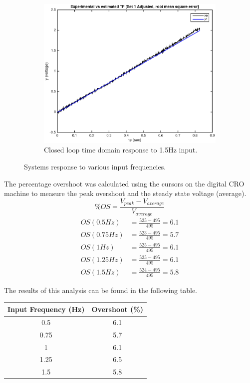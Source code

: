 \documentclass[11pt,a4paper]{article}
\begin{document}
\begin{enumerate}
\begin{figure}[H]
	  \begin{subfigure}{0.5\textwidth}
	  \includegraphics[width=0.9\linewidth]{Matlab_Figures/y2_dataset1_rms.eps}
	  \caption{Closed loop time domain response to 1.5Hz input.}
	  \label{fig:subim2}
	  \end{subfigure}
	\caption{\label{fig:freqimpact}Systems response to various input frequencies.}
	\end{figure}
	
	\pagebreak
	The percentage overshoot was calculated using the cursors on the digital CRO machine to measure the peak overshoot and the steady state voltage (average). 
	$$ \%OS = \frac{V_{peak}-V_{average}}{V_{average}} $$
	\begin{align*}
	OS(0.5Hz) 	&= \frac{525-495}{495} = 6.1 	\\
	OS(0.75Hz) 	&= \frac{523-495}{495} = 5.7 	\\
	OS(1Hz) 	&= \frac{525-495}{495} = 6.1 	\\
	OS(1.25Hz) 	&= \frac{525-495}{495} = 6.1 	\\
	OS(1.5Hz) 	&= \frac{524-495}{495} = 5.8 	
	\end{align*}
	
	The results of this analysis can be found in the following table.
	
\begin{center}
    \begin{tabular}{| c | c |}
    \hline
    Input Frequency (Hz)  & Overshoot (\%)  \\ \hline
    0.5  	                  & 6.1  		\\ \hline
	0.75  	                  & 5.7  		\\ \hline
	1		                  & 6.1 		\\ \hline
	1.25	                  & 6.5 		\\ \hline
	1.5		                  & 5.8 		\\
    \hline
    \end{tabular}
\end{center}
	

\end{enumerate}
\end{document}
